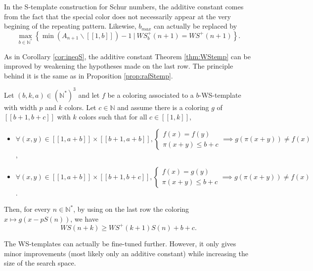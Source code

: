 \documentclass[final,onefignum,onetabnum]{siamart190516}
\newcommand{\WS}{\mathit{WS}}
\begin{document}
\begin{remark}
In the S-template construction for Schur numbers, the additive constant comes from the fact that the special color does
not necessarily appear at the very begining of the repeating pattern. Likewise, \(b_{max}\) can actually be replaced by
\[
\max_{b \in \mathbb{N}^*} \left\{\min (A_{n+1} \backslash [\![1, b ]\!]) - 1~|~ \WS_b^+(n+1) = \WS^+(n+1) \right\}.
\]
\end{remark}

As in Corollary \ref{cor:ineqS}, the additive constant Theorem \ref{thm:WStemp} can be improved 
by weakening the hypotheses made on the last row. The principle behind it is the same as in Proposition \ref{prop:rafStemp}.

\begin{proposition}
\label{prop:tunelastrow}
Let \((b, k, a) \in (\mathbb{N}^*)^3\) and let \(f\) be a coloring associated to a \(b\)-WS-template with width \(p\) and \(k\) colors. Let
\(c \in \mathbb{N}\) and assume there is a coloring \(g\) of \([\![b + 1, b + c]\!]\) with \(k\) colors such that for all \(c \in [\![1, k]\!]\),

\begin{itemize}
\item \(\forall (x, y) \in  [\![1, a + b]\!] \times  [\![b + 1, a + b]\!],  \left\{
	\begin{array}{l}
		f(x) = f(y) \\
		\pi(x + y) \leqslant b + c
	\end{array}
	\right. \implies g(\pi(x + y)) \neq f(x)\),
\item \(\forall (x, y) \in  [\![1, a + b]\!] \times  [\![b + 1, b + c]\!], \left\{
	\begin{array}{l}
		f(x) = g(y) \\
		\pi(x + y) \leqslant b + c
	\end{array}
	\right. \implies g(\pi(x + y)) \neq f(x)\).
\end{itemize}

Then, for every \(n \in \mathbb{N}^*\), by using on the last row the coloring \(x \longmapsto g(x - p S(n))\), we have\\
\[ \WS(n+k) \geqslant \WS^+(k+1) S(n) + b + c.\]
\end{proposition}

The WS-templates can actually be fine-tuned further. However, it only gives minor improvements (most likely only an 
additive constant) while increasing the size of the search space. 
\end{document}
